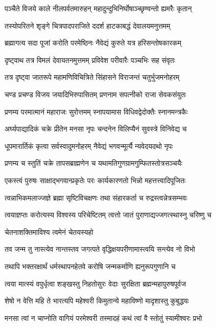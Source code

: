 \twolineshloka
{पञ्चैते विजये काले नीलपर्वतमारुहन्}
{महादुन्दुभिनिर्घोषाञ्च्छृण्वन्तो ह्यमरैः कृतान्}%

\twolineshloka
{तस्योपरितने शृङ्गे चित्रपादपराजिते}
{ददर्श हाटकाबद्धं देवालयमनुत्तमम्}%

\twolineshloka
{ब्रह्मागत्य सदा पूजां करोति परमेष्ठिनः}
{नैवेद्यं कुरुते यत्र हरिसन्तोषकारकम्}%

\twolineshloka
{दृष्ट्वाथ तत्र विमलं देवायतनमुत्तमम्}
{प्रविवेश परीवारैः पञ्चभिः सह संवृतः}%

\twolineshloka
{तत्र दृष्ट्वा जातरूपे महामणिविचित्रिते}
{सिंहासने विराजन्तं चतुर्भुजमनोहरम्}%

\twolineshloka
{चण्ड प्रचण्ड विजय जयादिभिरुपासितम्}
{प्रणनाम सपत्नीको राजा सेवकसंयुतः}%

\twolineshloka
{प्रणम्य परमात्मानं महाराजः सुरोत्तमम्}
{स्नापयामास विधिवद्वेदोक्तैः स्नानमन्त्रकैः}%

\twolineshloka
{अर्घ्यपाद्यादिकं चक्रे प्रीतेन मनसा नृपः}
{चन्दनेन विलिप्यैनं सुवस्त्रे विनिवेद्य च}%

\twolineshloka
{धूपमारार्तिकं कृत्वा सर्वस्वादुमनोहरम्}
{नैवेद्यं भगवन्मूर्त्यै न्यवेदयदथो नृपः}%

\twolineshloka
{प्रणम्य च स्तुतिं चक्रे तापसब्राह्मणेन च}
{यथामतिगुणग्रामगुम्फितस्तोत्रसञ्चयैः}%


\twolineshloka
{एकस्त्वं पुरुषः साक्षाद्भगवान्प्रकृतेः परः}
{कार्यकारणतो भिन्नो महत्तत्त्वादिपूजितः}%

\twolineshloka
{त्वन्नाभिकमलाज्जज्ञे ब्रह्मा सृष्टिविचक्षणः}
{तथा संहारकर्ता च रुद्रस्त्वन्नेत्रसम्भवः}%

\twolineshloka
{त्वयाज्ञप्तः करोत्यस्य विश्वस्य परिचेष्टितम्}
{त्वत्तो जातं पुराणाद्यज्जगत्स्थास्नु चरिष्णु च}%

चेतनाशक्तिमाविश्य त्वमेनं चेतयस्यहो

\twolineshloka
{तव जन्म तु नास्त्येव नान्तस्तव जगत्पते}
{वृद्धिक्षयपरीणामास्त्वयि सन्त्येव नो विभो}%

\twolineshloka
{तथापि भक्तरक्षार्थं धर्मस्थापनहेतवे}
{करोषि जन्मकर्माणि ह्यनुरूपगुणानि च}%

\twolineshloka
{त्वया मात्स्यं वपुर्धृत्वा शङ्खस्तु निहतोसुरः}
{वेदाः सुरक्षिता ब्रह्मन्महापुरुषपूर्वज}%

\twolineshloka
{शेषो न वेत्ति महि ते भारत्यपि महेश्वरी}
{किमुतान्ये महाविष्णो मादृशास्तु कुबुद्धयः}%

\twolineshloka
{मनसा त्वां न चाप्नोति वागियं परमेश्वरी}
{तस्मादहं कथं त्वां वै स्तोतुं स्यामीश्वरः प्रभो}%

